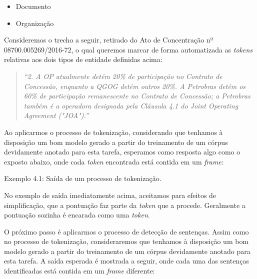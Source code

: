 \documentclass[11pt]{report}
\newcommand{\quotes}[1]{``#1''}
\begin{document}
\begin{itemize}
  \item Documento
  \item Organização
\end{itemize}

Consideremos o trecho a seguir, retirado do Ato de Concentração nº 08700.005269/2016-72, o qual queremos marcar de forma automatizada as \textit{tokens} relativas
aos dois tipos de entidade definidas acima:

\begin{quote}
  \textit{\quotes{2. A OP atualmente detém 20\% de participação no Contrato de Concessão, enquanto a QGOG detém outros 20\%.
  A Petrobras detém os 60\% de participação remanescente no Contrato de Concessão; a Petrobras também é a operadora designada
  pela Cláusula 4.1 do Joint Operating Agreement ("JOA").}}
\end{quote}

Ao aplicarmos o processo de tokenização, considerando que tenhamos à disposição um bom modelo gerado a partir do treinamento de um córpus devidamente anotado para esta tarefa,
esperamos como resposta algo como o exposto abaixo, onde cada \textit{token} encontrada está contida em um \textit{frame}:

\begin{quote}
             
       
              
       
         
\end{quote}
\begin{center}
  Exemplo 4.1: Saída de um processo de tokenização.
\end{center}

No exemplo de saída imediatamente acima, aceitamos para efeitos de simplificação, que a pontuação faz parte da \textit{token} que a procede.
Geralmente a pontuação sozinha é encarada como uma \textit{token}.

O próximo passo é aplicarmos o processo de detecção de sentenças. Assim como no processo de tokenização, consideraremos que tenhamos à disposição um bom modelo
gerado a partir do treinamento de um córpus devidamente anotado para esta tarefa. A saída esperada é mostrada a seguir, onde cada uma das sentenças identificadas está contida
em um \textit{frame} diferente:
\end{document}
